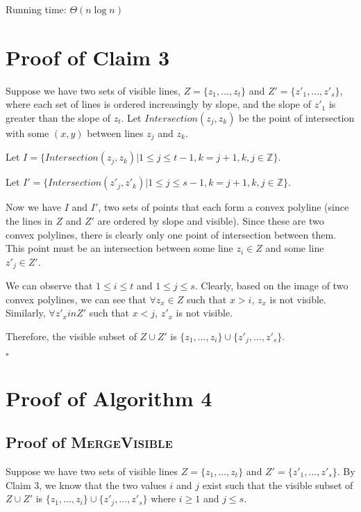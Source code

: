 \documentclass[12pt,letterpaper]{article}
\begin{document}
Running time: $\Theta(n\log{n})$

\section{Proof of Claim 3}

Suppose we have two sets of visible lines, $Z = \{ z_1, ..., z_t \}$ and $Z' = \{ z'_1, ..., z'_s \}$, where each set of lines is ordered increasingly by slope, and the slope of $z'_1$ is greater than the slope of $z_t$. Let $Intersection(z_j, z_k)$ be the point of intersection with some $(x, y)$ between lines $z_j$ and $z_k$. 

Let $I  = \{ Intersection(z_j, z_k) | 1 \leq j \leq t - 1, k = j + 1, k, j \in \mathbb{Z} \}$.

Let $I' = \{ Intersection(z'_j, z'_k) | 1 \leq j \leq s - 1, k = j + 1, k, j \in \mathbb{Z}  \}$.

Now we have $I$ and $I'$, two sets of points that each form a convex polyline (since the lines in $Z$ and $Z'$ are ordered by slope and visible). Since these are two convex polylines, there is clearly only one point of intersection between them. This point must be an intersection between some line $z_i \in Z$ and some line $z'_j \in Z'$.

We can observe that $1 \leq i \leq t$ and $1 \leq j \leq s$. Clearly, based on the image of two convex polylines, we can see that $\forall z_x \in Z$ such that $x > i$, $z_x$ is not visible. Similarly, $\forall z'_x in Z'$ such that $x < j$, $z'_x$ is not visible.

Therefore, the visible subset of $Z \cup Z'$ is $\{z_1, ..., z_i \} \cup \{ z'_j, ..., z'_s \}$.

$\square$

\section{Proof of Algorithm 4}

\subsection{Proof of \textsc{MergeVisible}}

Suppose we have two sets of visible lines $Z = \{ z_1, ..., z_t \}$ and $ Z' = \{ z'_1, ..., z'_s \}$.
By Claim 3, we know that the two values $i$ and $j$ exist such that the visible subset of $Z \cup Z'$ is 
$\{z_1, ..., z_i \} \cup \{ z'_j, ..., z'_s \}$ where $i \geq 1$ and $j \leq s$.
\end{document}
